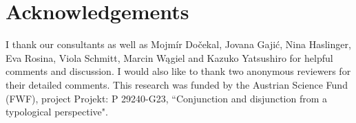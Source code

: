 \documentclass[output=paper]{langscibook}
\begin{document}
\section*{Acknowledgements}

I thank our consultants as well as Mojmír Dočekal, Jovana Gajić, Nina Haslinger, Eva Rosina, Viola Schmitt, Marcin Wągiel and Kazuko Yatsushiro for helpful comments and discussion. I would also like to thank two anonymous reviewers for their detailed comments. This research was funded by the Austrian Science Fund (FWF), project Projekt: P 29240-G23, ``Conjunction and disjunction from a typological perspective". 

{\sloppy\printbibliography[heading=subbibliography,notkeyword=this]}
\end{document}
